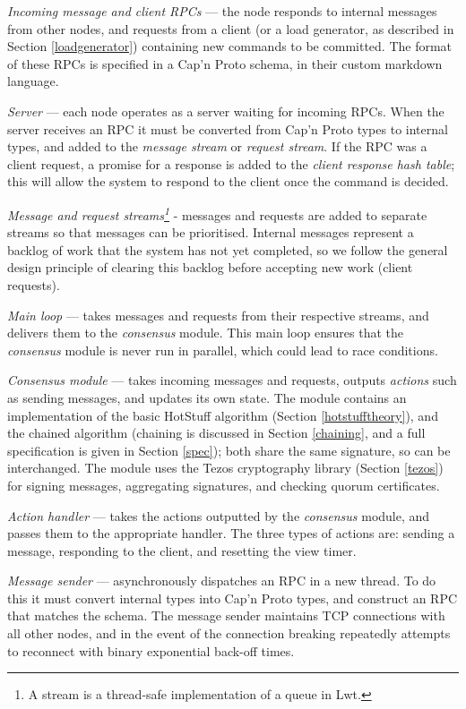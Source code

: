 \begin{description}
	\item \textit{Incoming message and client RPCs} --- the node responds to internal messages from other nodes, and requests from a client (or a load generator, as described in Section \ref{loadgenerator}) containing new commands to be committed. The format of these RPCs is specified in a Cap'n Proto schema, in their custom markdown language.
	\item \textit{Server} --- each node operates as a server waiting for incoming RPCs. When the server receives an RPC it must be converted from Cap'n Proto types to internal types, and added to the \textit{message stream} or \textit{request stream}. If the RPC was a client request, a promise for a response is added to the \textit{client response hash table}; this will allow the system to respond to the client once the command is decided.
	\item \textit{Message and request streams\footnote{A stream is a thread-safe implementation of a queue in Lwt.}} - messages and requests are added to separate streams so that messages can be prioritised. Internal messages represent a backlog of work that the system has not yet completed, so we follow the general design principle of clearing this backlog before accepting new work (client requests).
	\item \textit{Main loop} --- takes messages and requests from their respective streams, and delivers them to the \textit{consensus} module. This main loop ensures that the \textit{consensus} module is never run in parallel, which could lead to race conditions.
	\item \textit{Consensus module} --- takes incoming messages and requests, outputs \textit{actions} such as sending messages, and updates its own state. The module contains an implementation of the basic HotStuff algorithm (Section \ref{hotstufftheory}), and the chained algorithm (chaining is discussed in Section \ref{chaining}, and a full specification is given in Section \ref{spec}); both share the same signature, so can be interchanged. The module uses the Tezos cryptography library (Section \ref{tezos}) for signing messages, aggregating signatures, and checking quorum certificates.
	\item \textit{Action handler} --- takes the actions outputted by the \textit{consensus} module, and passes them to the appropriate handler. The three types of actions are: sending a message, responding to the client, and resetting the view timer.
	\item \textit{Message sender} --- asynchronously dispatches an RPC in a new thread. To do this it must convert internal types into Cap'n Proto types, and construct an RPC that matches the schema. The message sender maintains TCP connections with all other nodes, and in the event of the connection breaking repeatedly attempts to reconnect with binary exponential back-off times.

\end{description}
